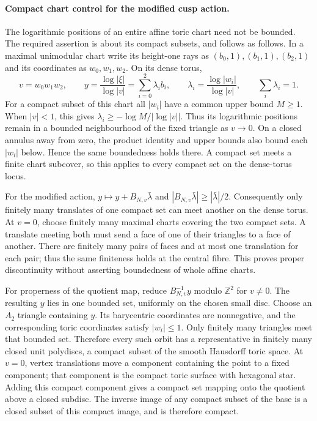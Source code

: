 \paragraph{Compact chart control for the modified cusp action.}
The logarithmic positions of an entire affine toric chart need not be
bounded. The required assertion is about its compact subsets, and follows
as follows. In a maximal unimodular chart write its height-one rays as
$(b_0,1),(b_1,1),(b_2,1)$ and its coordinates as $w_0,w_1,w_2$.
On its dense torus,
\[
 v=w_0w_1w_2,\qquad
 y=\frac{\log|\xi|}{\log|v|}
   =\sum_{i=0}^2\lambda_i b_i,\qquad
 \lambda_i=\frac{\log|w_i|}{\log|v|},\qquad
 \sum_i\lambda_i=1.
\]
For a compact subset of this chart all $|w_i|$ have a common upper
bound $M\ge1$. When $|v|<1$, this gives
$\lambda_i\ge-\log M/|\log|v||$. Thus its logarithmic positions remain
in a bounded neighbourhood of the fixed triangle as $v\to0$.
On a closed annulus away from zero, the product identity and upper
bounds also bound each $|w_i|$ below. Hence the same boundedness holds
there. A compact set meets a finite chart subcover, so this applies
to every compact set on the dense-torus locus.

For the modified action,
$y\mapsto y+B_{N,v}\bar\lambda$ and
$|B_{N,v}\bar\lambda|\ge|\bar\lambda|/2$.
Consequently only finitely many translates of one compact set can
meet another on the dense torus. At $v=0$, choose finitely many
maximal charts covering the two compact sets. A translate meeting
both must send a face of one of their triangles to a face of another.
There are finitely many pairs of faces and at most one translation
for each pair; thus the same finiteness holds at the central fibre.
This proves proper discontinuity without asserting boundedness of
whole affine charts.

For properness of the quotient map, reduce
$B_{N,v}^{-1}y$ modulo $\mathbb Z^2$ for $v\ne0$. The resulting $y$
lies in one bounded set, uniformly on the chosen small disc. Choose
an $A_2$ triangle containing $y$. Its barycentric coordinates are
nonnegative, and the corresponding toric coordinates satisfy
$|w_i|\le1$. Only finitely many triangles meet that bounded set.
Therefore every such orbit has a representative in finitely many
closed unit polydiscs, a compact subset of the smooth Hausdorff toric
space. At $v=0$, vertex translations move a component containing the
point to a fixed component; that component is the compact toric
surface with hexagonal star. Adding this compact component gives
a compact set mapping onto the quotient above a closed subdisc.
The inverse image of any compact subset of the base is a closed
subset of this compact image, and is therefore compact.
